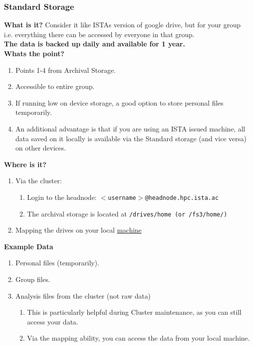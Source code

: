 \documentclass{article}
\begin{document}
\subsubsection{Standard Storage}
\textbf{What is it?}
\newline
Consider it like ISTAs version of google drive, but for your group i.e. everything there can be accessed by everyone in that group.
\\
\textbf{The data is backed up daily and available for 1 year.}
\\

\noindent
\textbf{Whats the point?}
\newline
\begin{enumerate}
    \item Points 1-4 from Archival Storage.
    \item Accessible to entire group.
    \item If running low on device storage, a good option to store personal files temporarily. 
    \item An additional advantage is that if you are using an ISTA issued machine, all data saved on it locally is available via the Standard storage (and vice versa) on other devices.
\end{enumerate}

\noindent
\textbf{Where is it?}
\newline
\begin{enumerate}
    \item Via the cluster: 
    \begin{enumerate}
        \item Login to the headnode: \texttt{$<$username$>$@headnode.hpc.ista.ac}
        \item The archival storage is located at \texttt{/drives/home (or /fs3/home/)}
    \end{enumerate}
    \item Mapping the drives on your local \href{https://it.pages.ist.ac.at/docs/it-documentation/fileservers/fileshare/}{machine}
\end{enumerate}

\noindent
\textbf{Example Data}
\begin{enumerate}
    \item Personal files (temporarily).
    \item Group files.
    \item Analysis files from the cluster (not raw data)
    \begin{enumerate}
        \item This is particularly helpful during Cluster maintenance, as you can still access your data.
        \item Via the mapping ability, you can access the data from your local machine.
    \end{enumerate}

\end{enumerate}
\end{document}
